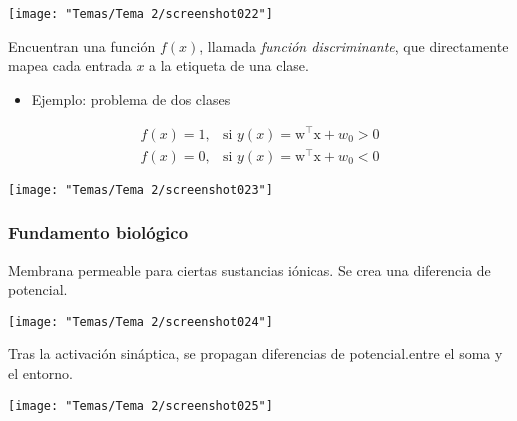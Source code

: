 \begin{center}
	\texttt{[image: "Temas/Tema 2/screenshot022"]}
\end{center}
Encuentran una función $f(x)$, llamada \textit{función discriminante}, que directamente mapea cada entrada $x$ a la etiqueta de una clase.

\begin{minipage}{0.5\textwidth}
	\begin{itemize}[label=\color{red}\textbullet, leftmargin=*]
		\item \color{lightblue}Ejemplo: problema de dos clases
	\end{itemize}
	\[ \begin{array}{ll}
		f(x)=1, & \text{si }y(x)=\mathrm{w}^\intercal\mathrm{x}+w_0>0\\
		f(x)=0, & \text{si }y(x)=\mathrm{w}^\intercal\mathrm{x}+w_0<0
	\end{array} \]
\end{minipage}\qquad\begin{minipage}{0.5\textwidth}
\begin{center}
	\texttt{[image: "Temas/Tema 2/screenshot023"]}
\end{center}

\end{minipage}
\subsubsection{Fundamento biológico}
Membrana permeable para ciertas sustancias iónicas. Se crea una diferencia de potencial.

\begin{center}
	\texttt{[image: "Temas/Tema 2/screenshot024"]}
\end{center}
Tras la activación sináptica, se propagan diferencias de potencial.entre el soma y el entorno.
\begin{center}
	\texttt{[image: "Temas/Tema 2/screenshot025"]}
\end{center}
